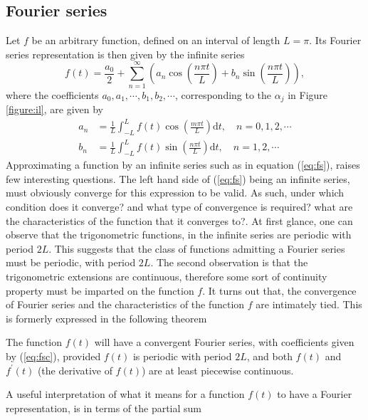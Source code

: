 \documentclass[../Main/thesis.tex]{subfiles}
\begin{document}
\justify
\subsection{Fourier series}
\label{sec:fouurier-serie}
 Let $f$ be an arbitrary function, defined on an interval of length $L = \pi$. Its Fourier series representation is then given by the infinite series
\begin{equation}\label{eq:fs}
f(t) = \frac{a_{0}}{2} +\sum_{n=1}^{\infty}\left( a_{n} \cos\left( \frac{n\pi t}{L}\right) + b_{n} \sin\left( \frac{n\pi t}{L}\right)  \right),
 \end{equation}
where the coefficients $a_{0}, a_{1}, \cdots, b_{1}, b_{2},\cdots$, corresponding to the $\alpha_{j}$ in Figure \ref{figure:il}, are given by 
\begin{equation}\label{eq:fsc}
\begin{split}
a_{n} &= \frac{1}{L}\int_{-L}^{L}f(t)\cos\left( \frac{m\pi t}{L}\right) \mathrm{d}t,\quad n=0,1,2,\cdots\\
b_{n} &= \frac{1}{L}\int_{-L}^{L}f(t)\sin\left( \frac{n\pi t}{L}\right) \mathrm{d}t,\quad n=1,2,\cdots
\end{split}
\end{equation}
 Approximating a function by an infinite series such as in equation (\ref{eq:fs}), raises few interesting questions. The left hand side of (\ref{eq:fs}) being an infinite series, must obviously converge for this expression to be valid. As such, under which condition does it converge? and what type of convergence is required? what are the characteristics of the function that it converges to?.
\justify
At first glance, one can observe that the trigonometric functions, in the infinite series are periodic with period $2L$. This suggests that the class of functions admitting a Fourier series must be periodic, with period $2L$. The second observation is that the trigonometric extensions are continuous, therefore some sort of continuity property must be imparted on the function $f$. It turns out that, the convergence of Fourier series and the characteristics of the function $f$ are intimately tied. This is formerly expressed in the following theorem
\begin{theorem}
	The function $f(t)$ will  have a convergent Fourier series, with coefficients given by (\ref{eq:fsc}), provided $f(t)$ is periodic with period $2L$, and both $f(t)$ and $f^{\prime}(t)$ (the derivative of $f(t)$) are at least piecewise continuous.
\end{theorem}
\justify
A useful interpretation of what it means for a function $f(t)$ to have a Fourier representation, is in terms of the partial sum
\end{document}
